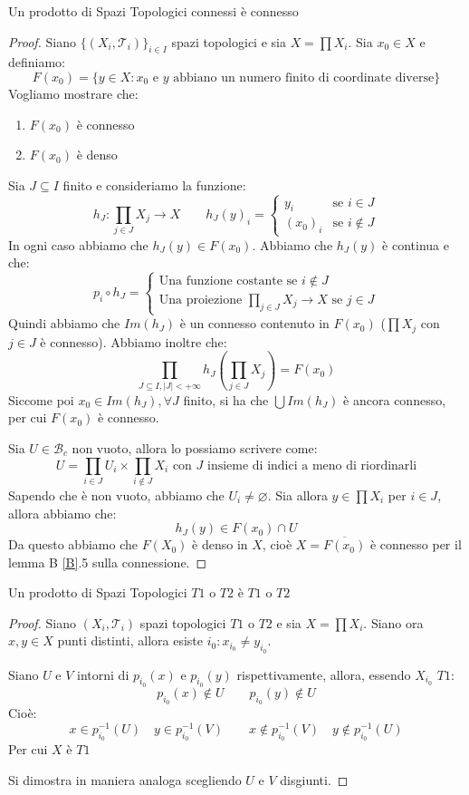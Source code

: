 \documentclass[11pt,a4paper,twoside]{article}
\theoremstyle{definition}
\begin{document}
\begin{thm}{}{}
	Un prodotto di Spazi Topologici connessi è connesso
\end{thm}
\begin{proof}
	Siano $\{( X_i, \mathcal T_i )\}_{i \in I}$ spazi topologici e sia $X = \prod X_i$. Sia $x_0 \in X$ e definiamo:
	\[ F(x_0) = \{y \in X: x_0 \text{ e } y \text{ abbiano un numero finito di coordinate diverse}\} \]
	Vogliamo mostrare che:
	\begin{enumerate}
		\item $F(x_0)$ è connesso
		\item $F(x_0)$ è denso
	\end{enumerate}

	 Sia $J \subseteq I$ finito e consideriamo la funzione:
	\[ h_J: \prod_{j \in J} X_j \to X \qquad h_J(y)_i = \begin{cases}
		y_i & \text{se }i \in J\\
		(x_0)_i & \text{se } i \not \in J
	\end{cases}\]
	In ogni caso abbiamo che $h_J(y) \in F(x_0)$. Abbiamo che $h_J(y)$ è continua e che:
	\[ p_i \circ h_J = \begin{cases}
		\text{Una funzione costante se } i \not \in J\\
		\text{Una proiezione }\displaystyle{\prod_{j \in J}X_j \to X} \text{ se } j \in J
	\end{cases}\]
	Quindi abbiamo che $Im(h_J)$ è un connesso contenuto in $F(x_0)$ ($\prod X_j$ con $j \in J$ è connesso). Abbiamo inoltre che:
	\[ \prod_{J \subseteq I, |J|<+\infty} h_J\left( \prod_{j\in J} X_j \right)  = F(x_0)\]
	Siccome poi $x_0 \in Im(h_J), \forall J$ finito, si ha che $\bigcup Im(h_J)$ è ancora connesso, per cui $F(x_0)$ è connesso.

	 Sia $U \in \mathcal B_c$ non vuoto, allora lo possiamo scrivere come:
	\[ U = \prod_{i \in J} U_i \times \prod_{i \not \in J}X_i \text{ con }J \text{ insieme di indici a meno di riordinarli}\]
	Sapendo che è non vuoto, abbiamo che $U_i \neq \varnothing$. Sia allora $y \in \prod X_i$ per $i \in J$, allora abbiamo che:
	\[ h_J(y) \in F(x_0)\cap U \]
	Da questo abbiamo che $F(X_0)$ è denso in $X$, cioè $X = \overline{F(x_0)}$ è connesso per il lemma B \ref{B}.5 sulla connessione.
\end{proof}

\begin{prop}{}{}
	Un prodotto di Spazi Topologici $T1$ o $T2$ è $T1$ o $T2$
\end{prop}
\begin{proof}
	Siano ${(X_i,\mathcal T_i)}$ spazi topologici $T1$ o $T2$ e sia $X = \prod X_i$. Siano ora $x,y \in X$ punti distinti, allora esiste $i_0: x_{i_0} \neq y_{i_0}$.

	 Siano $U$ e $V$ intorni di $p_{i_0}(x)$ e $p_{i_0}(y)$ rispettivamente, allora, essendo $X_{i_0}$ $T1$:
	\[ p_{i_0}(x) \not \in U \qquad p_{i_0}(y) \not \in U \]
	Cioè:
	\[ x \in p^{-1}_{i_0}(U) \quad y \in p^{-1}_{i_0}(V) \qquad x \not\in p^{-1}_{i_0}(V) \quad  y \not\in p^{-1}_{i_0}(U) \]
	Per cui $X$ è $T1$

	 Si dimostra in maniera analoga scegliendo $U$ e $V$ disgiunti.
\end{proof}
\end{document}
